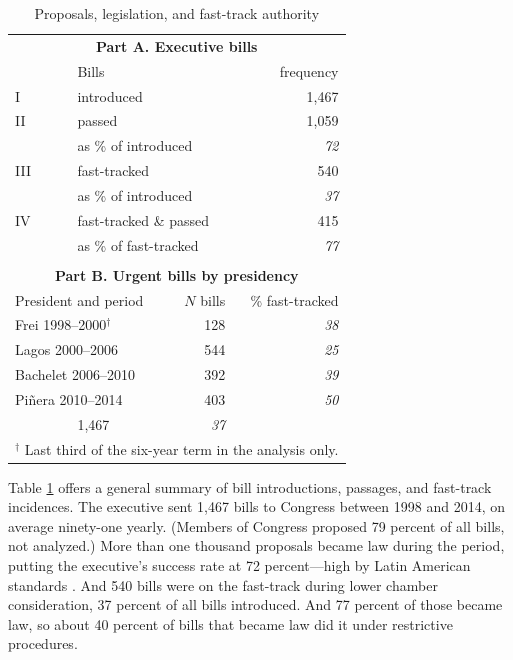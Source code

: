 \documentclass[letter,12pt]{article}
\begin{document}
\begin{table}
\centering
\caption{Proposals, legislation, and fast-track authority}\label{T:billDescriptives}
\begin{tabular}{llrr}
\multicolumn{4}{c}{\textbf{Part A. Executive bills}} \\
   & \multicolumn{2}{l}{Bills}                           &   frequency  \\ \hline
I  & \multicolumn{2}{l}{introduced}                      &       1,467  \\ \hdashline
II & \multicolumn{2}{l}{passed}                          &       1,059  \\
   & \multicolumn{2}{l}{as \% of introduced}             &   \emph{72}  \\ \hdashline
III& \multicolumn{2}{l}{fast-tracked}                    &         540  \\
   & \multicolumn{2}{l}{as \% of introduced}             &   \emph{37}  \\ \hdashline
IV & \multicolumn{2}{l}{fast-tracked \& passed}          &         415  \\
   & \multicolumn{2}{l}{as \% of fast-tracked}           &   \emph{77}  \\ \hline
\\
\multicolumn{4}{c}{\textbf{Part B. Urgent bills by presidency}} \\
\multicolumn{2}{l}{President and period}    & $N$ bills & \% fast-tracked \\ \hline
\multicolumn{2}{l}{Frei 1998--2000$^\dagger$} & 128       &  \emph{38} \\
\multicolumn{2}{l}{Lagos 2000--2006}        & 544       &  \emph{25} \\
\multicolumn{2}{l}{Bachelet 2006--2010}     & 392       &  \emph{39} \\
\multicolumn{2}{l}{Pi\~nera 2010--2014}       & 403       &  \emph{50} \\ \hdashline
\multicolumn{2}{l}{All 1998--2014}          & 1,467     &  \emph{37} \\
\hline
\multicolumn{4}{r}{\footnotesize{$^\dagger$ Last third of the six-year term in the analysis only.}} \\
\end{tabular}
\end{table}

Table \ref{T:billDescriptives} offers a general summary of bill introductions, passages, and fast-track incidences. The executive sent 1,467 bills to Congress between 1998 and 2014, on average ninety-one yearly. (Members of Congress proposed 79 percent of all bills, not analyzed.) More than one thousand proposals became law during the period, putting the executive's success rate at 72 percent---high by Latin American standards \citep{morgenstern.nacif.2002}. And 540 bills were on the fast-track during lower chamber consideration, 37 percent of all bills introduced. And 77 percent of those became law, so about 40 percent of bills that became law did it under restrictive procedures. 
\end{document}
